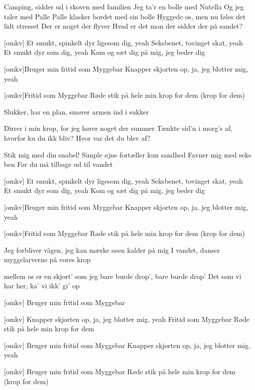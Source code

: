 \documentclass[a4paper,11pt]{article}
\begin{document}
\begin{song}
   Camping, sidder ud i skoven med familien
                 Jeg ta’r en bolle med Nutella
                 Og jeg taler med Palle
  Palle klasker bordet med sin bolle
                 Hyggede os, men nu føles det lidt stresset
	      Der er noget der flyver
	      Hvad er det mon der sidder der på sandet?


  [omkv] Et smukt, spinkelt dyr ligesom dig, yeah 
	                  Seksbenet, tovinget skat, yeah
		       Et smukt dyr som dig, yeah
		       Kom og sæt dig på mig, jeg beder dig
 
 [omkv]Bruger min fritid som Myggebar
		     Knapper skjorten op, ja, jeg blotter mig, yeah


 [omkv]Fritid som Myggebar
                          Røde stik på hele min krop for dem (krop for dem)

Slukker, har en plan, smører armen ind i sukker

Dirrer i min krop, for jeg hører noget der summer
             Tænkte sid’n i morg’s af, hvorfor ku du ikk bliv?
             Hvor var det du blev af?

Stik mig med din snabel!
              Simple øjne fortæller kun sandhed
              Favner mig med seks ben
             Før du må tilbage ud til vandet

  [omkv] Et smukt, spinkelt dyr ligesom dig, yeah 
	                  Seksbenet, tovinget skat, yeah
		       Et smukt dyr som dig, yeah
		       Kom og sæt dig på mig, jeg beder dig
 
 [omkv]Bruger min fritid som Myggebar
		     Knapper skjorten op, ja, jeg blotter mig, yeah


 [omkv]Fritid som Myggebar
                          Røde stik på hele min krop for dem (krop for dem)

Jeg forbliver vågen, jeg kan mærke søen kalder på mig
               I vandet, danser myggelarverne på vores krop 

	    mellem os er en skjort’ som jeg bare burde drop’, bare burde drop’
	    Det som vi har her, ka’ vi ikk’ gi’ op

 [omkv] Bruger min fritid som Myggebar

 [omkv] Knapper skjorten op, ja, jeg blotter mig, yeah
                           Fritid som Myggebar
	                Røde stik på hele min krop for dem 




 [omkv] Bruger min fritid som Myggebar
	                 Knapper skjorten op, ja, jeg blotter mig, yeah


 [omkv] Bruger min fritid som Myggebar
                           Røde stik på hele min krop for dem (krop for dem)


\end{song}
\end{document}

